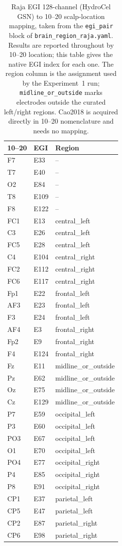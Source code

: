 \begin{table}[ht]
\centering
\footnotesize
\caption{Raja EGI 128-channel (HydroCel GSN) to 10--20 scalp-location mapping, taken from the \texttt{egi\_pair} block of \texttt{brain\_region\_raja.yaml}. Results are reported throughout by 10--20 location; this table gives the native EGI index for each one. The region column is the assignment used by the Experiment~1 run; \texttt{midline\_or\_outside} marks electrodes outside the curated left/right regions. Cao2018 is acquired directly in 10--20 nomenclature and needs no mapping.}
\label{tab:egi_map}
\begin{tabular}{lll}
\toprule
10--20 & EGI & Region \\
\midrule
F7 & E33 & -- \\
T7 & E40 & -- \\
O2 & E84 & -- \\
T8 & E109 & -- \\
F8 & E122 & -- \\
FC1 & E13 & central\_left \\
C3 & E26 & central\_left \\
FC5 & E28 & central\_left \\
C4 & E104 & central\_right \\
FC2 & E112 & central\_right \\
FC6 & E117 & central\_right \\
Fp1 & E22 & frontal\_left \\
AF3 & E23 & frontal\_left \\
F3 & E24 & frontal\_left \\
AF4 & E3 & frontal\_right \\
Fp2 & E9 & frontal\_right \\
F4 & E124 & frontal\_right \\
Fz & E11 & midline\_or\_outside \\
Pz & E62 & midline\_or\_outside \\
Oz & E75 & midline\_or\_outside \\
Cz & E129 & midline\_or\_outside \\
P7 & E59 & occipital\_left \\
P3 & E60 & occipital\_left \\
PO3 & E67 & occipital\_left \\
O1 & E70 & occipital\_left \\
PO4 & E77 & occipital\_right \\
P4 & E85 & occipital\_right \\
P8 & E91 & occipital\_right \\
CP1 & E37 & parietal\_left \\
CP5 & E47 & parietal\_left \\
CP2 & E87 & parietal\_right \\
CP6 & E98 & parietal\_right \\
\bottomrule
\end{tabular}
\end{table}

